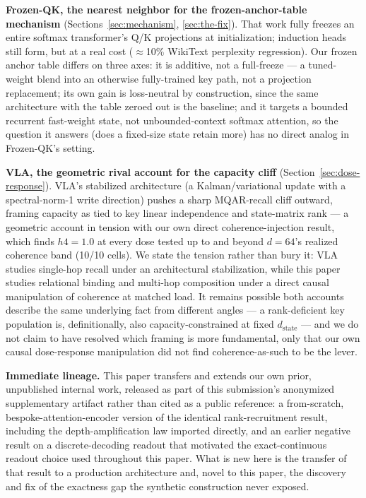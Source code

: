 \textbf{Frozen-QK, the nearest neighbor for the frozen-anchor-table
mechanism} \citep{dong2025frozenqk} (Sections~\ref{sec:mechanism},
\ref{sec:the-fix}). That work fully freezes an entire softmax
transformer's Q/K projections at initialization; induction heads still
form, but at a real cost ($\approx$10\% WikiText perplexity regression).
Our frozen anchor table differs on three axes: it is additive, not a
full-freeze --- a tuned-weight blend into an otherwise fully-trained key
path, not a projection replacement; its own gain is loss-neutral by
construction, since the same architecture with the table zeroed out is
the baseline; and it targets a bounded recurrent fast-weight state, not
unbounded-context softmax attention, so the question it answers (does a
fixed-size state retain more) has no direct analog in Frozen-QK's
setting.

\textbf{VLA, the geometric rival account for the capacity cliff}
\citep{pandey2026vla} (Section~\ref{sec:dose-response}). VLA's stabilized
architecture (a Kalman/variational update with a spectral-norm-1 write
direction) pushes a sharp MQAR-recall cliff outward, framing capacity as
tied to key linear independence and state-matrix rank --- a geometric
account in tension with our own direct coherence-injection result, which
finds $h4{=}1.0$ at every dose tested up to and beyond $d{=}64$'s realized
coherence band (10/10 cells). We state the tension rather than bury it:
VLA studies single-hop recall under an architectural stabilization, while
this paper studies relational binding and multi-hop composition under a
direct causal manipulation of coherence at matched load. It remains
possible both accounts describe the same underlying fact from different
angles --- a rank-deficient key population is, definitionally, also
capacity-constrained at fixed $d_{\mathrm{state}}$ --- and we do not
claim to have resolved which framing is more fundamental, only that our
own causal dose-response manipulation did not find coherence-as-such to
be the lever.

\textbf{Immediate lineage.} This paper transfers and extends our own
prior, unpublished internal work, released as part of this submission's
anonymized supplementary artifact rather than cited as a public
reference: a from-scratch, bespoke-attention-encoder version of the
identical rank-recruitment result, including the depth-amplification law
imported directly, and an earlier negative result on a discrete-decoding
readout that motivated the exact-continuous readout choice used
throughout this paper. What is new here is the transfer of that result to
a production architecture and, novel to this paper, the discovery and
fix of the exactness gap the synthetic construction never exposed.
